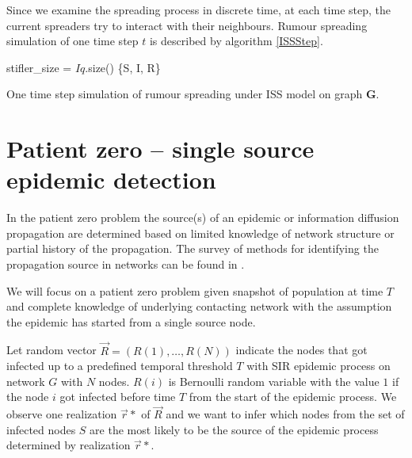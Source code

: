 \documentclass[times, utf8, diplomski]{fer}
\begin{document}
Since we examine the spreading process in discrete time, at each time step, the current spreaders try to interact with their neighbours. Rumour spreading simulation of one time step $t$ is described by algorithm \ref{ISSStep}.

\vspace{10mm}

\begin{algorithm}[H]
 stifler\_size = $Iq$.size()\;
  \Return \{S, I, R\}
 \label{ISSStep}
 \caption{One time step simulation of rumour spreading under ISS model on graph $\mathbf{G}$.}
\end{algorithm}

\chapter{Patient zero -- single source epidemic detection}
In the patient zero problem the source(s) of an epidemic or information diffusion propagation are determined based on limited knowledge of network structure or partial history of the propagation. The survey of methods for identifying the propagation source in networks can be found in \cite{soa_source}.

We will focus on a patient zero problem given snapshot of population at time $T$ and complete knowledge of underlying contacting network with the assumption the epidemic has started from a single source node. 

Let random vector $\vec R = (R(1), \ldots, R(N))$ indicate the nodes that got infected up to a predefined temporal threshold $T$ with SIR epidemic process on network $G$ with $N$ nodes. $R(i)$ is Bernoulli random variable with the value $1$ if the node $i$ got infected before time $T$ from the start of the epidemic process. We observe one realization $\vec r*$ of $\vec R$ and we want to infer which nodes from the set of infected nodes $S$ are the most likely to be the source of the epidemic process determined by realization $\vec r*$.
\end{document}
